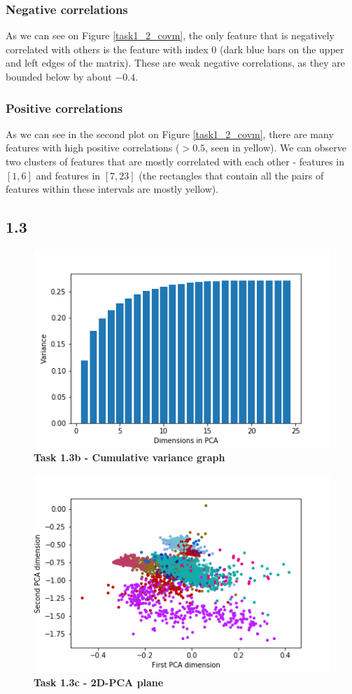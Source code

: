 \documentclass[12pt]{article}
\begin{document}
\subsubsection*{Negative correlations}
As we can see on Figure \ref{task1_2_covm}, the only feature that is negatively correlated with others is the feature with index $0$ (dark blue bars on the upper and left edges of the matrix). These are weak negative correlations, as they are bounded below by about $-0.4$.
\subsubsection*{Positive correlations}
As we can see in the second plot on Figure \ref{task1_2_covm}, there are many features with high positive correlations ($>0.5$, seen in yellow). We can observe two clusters of features that are mostly correlated with each other - features in $[1,6]$ and features in $[7,23]$ (the rectangles that contain all the pairs of features within these intervals are mostly yellow).

\newpage
\subsection*{1.3}

\begin{figure}[!htb]
\centering
\includegraphics[scale=0.8]{task1_3b_cumvar_graph.png}
\caption{\textbf{Task 1.3b - Cumulative variance graph}}
\end{figure}

\begin{figure}[!htb]
\centering
\includegraphics[scale=1]{task1_3c_scatter_classes.png}
\caption{\textbf{Task 1.3c - 2D-PCA plane}}
\end{figure}
\end{document}
